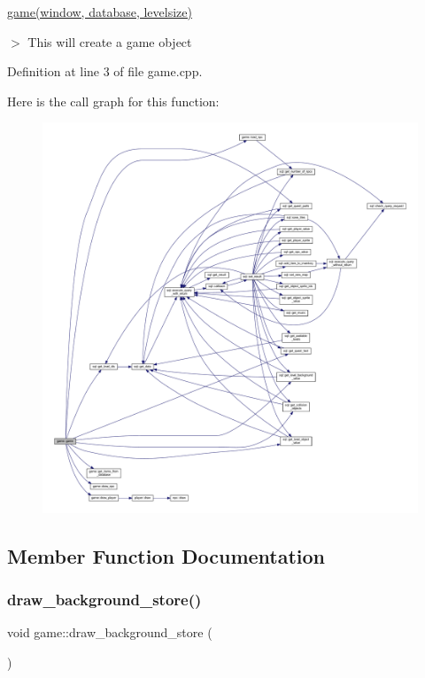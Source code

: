 \hyperlink{classgame}{game(window, database, levelsize)} ~\newline

\begin{DoxyItemize}
\item $>$ This will create a \textquotesingle{}game\textquotesingle{} object 
\end{DoxyItemize}

Definition at line 3 of file game.\+cpp.

Here is the call graph for this function\+:
\nopagebreak
\begin{figure}[H]
\begin{center}
\leavevmode
\includegraphics[width=350pt]{classgame_a46eaf7a077e7f3ff0b5e229142358f00_cgraph}
\end{center}
\end{figure}


\subsection{Member Function Documentation}
\mbox{\label{classgame_a4cf9147e06874edfc6190db64d719dec}} 
\subsubsection{\texorpdfstring{draw\+\_\+background\+\_\+store()}{draw\_background\_store()}}
{\footnotesize\ttfamily void game\+::draw\+\_\+background\+\_\+store (\begin{DoxyParamCaption}{ }\end{DoxyParamCaption})\hspace{0.3cm}{\ttfamily [private]}}



